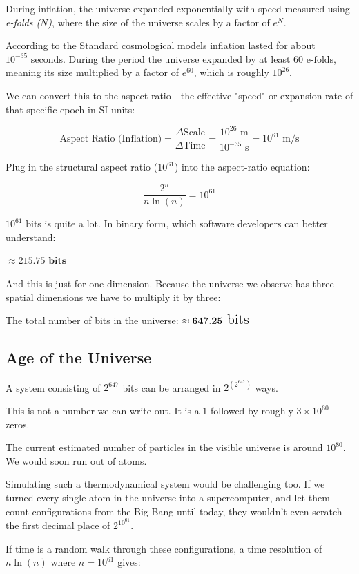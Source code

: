 During inflation, the universe expanded exponentially with speed measured using \textit{e-folds ($N$)}, where the size of the universe scales by a factor of $e^N$.

According to the Standard cosmological models inflation lasted for about $10^{-35}\text{ seconds}$.
During the period the universe expanded by at least $60\text{ e-folds}$, meaning its size multiplied
by a factor of $e^{60}$, which is roughly $10^{26}$.

We can convert this to the aspect ratio—the effective "speed" or expansion rate of that specific epoch in SI units:

\[
\text{Aspect Ratio (Inflation)} = \frac{\Delta \text{Scale}}{\Delta \text{Time}} = \frac{10^{26}\text{ m}}{10^{-35}\text{ s}} = 10^{61}\text{ m/s}
\]


Plug in the structural aspect ratio ($10^{61}$) into the aspect-ratio equation:

$$
\frac{2^n}{n \ln(n)} = 10^{61}
$$

$10^{61}$ bits is quite a lot. In binary form, which software developers can better understand:

$\approx \mathbf{215.75\text{ bits}}$

And this is just for one dimension. Because the universe we observe has three spatial dimensions
we have to multiply it by three:

The total number of bits in the universe: $\Large \approx \mathbf{647.25\text{ bits}}$


\subsection*{Age of the Universe}

A system consisting of $2^647$ bits can be arranged in $2^(2^647)$ ways.

This is not a number we can write out. It is a $1$ followed by roughly $3 \times 10^{60}$ zeros.

The current estimated number of particles in the visible universe is around $10^{80}$. We would
soon run out of atoms. 

Simulating such a thermodynamical system would be challenging too.
If we turned every single atom in the universe into a supercomputer, and let them count configurations
from the Big Bang until today, they wouldn't even scratch the first decimal place of $2^{10^{61}}$.

If time is a random walk through these configurations, a time resolution of $n \ln(n)$ where $n = 10^{61}$ gives:

